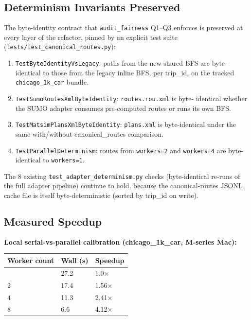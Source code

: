 \subsection{Determinism Invariants
Preserved}\label{383-determinism-invariants-preserved}

The byte-identity contract that \texttt{audit\_fairness} Q1--Q3 enforces
is preserved at every layer of the refactor, pinned by an explicit test
suite (\texttt{tests/test\_canonical\_routes.py}):

\begin{enumerate}
\def\labelenumi{\arabic{enumi}.}
\tightlist
\item
  \texttt{TestByteIdentityVsLegacy}: paths from the new shared BFS are
  byte-identical to those from the legacy inline BFS, per trip\_id, on
  the tracked \texttt{chicago\_1k\_car} bundle.
\item
  \texttt{TestSumoRoutesXmlByteIdentity}: \texttt{routes.rou.xml} is
  byte- identical whether the SUMO adapter consumes pre-computed routes
  or runs its own BFS.
\item
  \texttt{TestMatsimPlansXmlByteIdentity}: \texttt{plans.xml} is
  byte-identical under the same with/without-canonical\_routes
  comparison.
\item
  \texttt{TestParallelDeterminism}: routes from \texttt{workers=2} and
  \texttt{workers=4} are byte-identical to \texttt{workers=1}.
\end{enumerate}

The 8 existing \texttt{test\_adapter\_determinism.py} checks
(byte-identical re-runs of the full adapter pipeline) continue to hold,
because the canonical-routes JSONL cache file is itself
byte-deterministic (sorted by trip\_id on write).

\subsection{Measured Speedup}\label{384-measured-speedup}

\textbf{Local serial-vs-parallel calibration (chicago\_1k\_car, M-series
Mac):}

\begin{longtable}[]{@{}lll@{}}
\toprule\noalign{}
Worker count & Wall (s) & Speedup \\
\midrule\noalign{}
\endhead
\bottomrule\noalign{}
\endlastfoot
1 & 27.2 & 1.0× \\
2 & 17.4 & 1.56× \\
4 & 11.3 & 2.41× \\
8 & 6.6 & 4.12× \\
\end{longtable}

